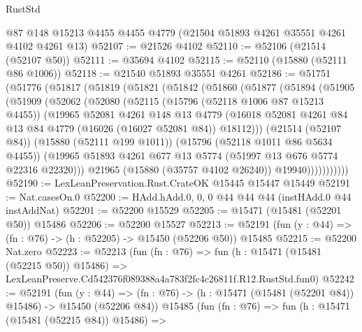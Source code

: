 \begin{lexlean}{RustStd}
\begin{coremodule}
    @87
    @148
    @15213
    @4455
    @4455
    @4779
    (@21504 @51893 @4261 @35551 @4261 @4102 @4261 @13)
@52107 := @21526 @4102
@52110 := @52106 (@21514 (@52107 @50))
@52111 := @35694 @4102
@52115 := @52110 (@15880 (@52111 @86 @1006))
@52118 := @21540 @51893 @35551 @4261
@52186 := @51751
    (@51776
      (@51817
        (@51819
          (@51821
            (@51842
              (@51860
                (@51877
                  (@51894
                    (@51905
                      (@51909
                        (@52062
                          (@52080
                            (@52115
                              (@15796 (@52118 @1006 @87 @15213 @4455))
                              (@19965
                                @52081
                                @4261
                                @148
                                @13
                                @4779
                                (@16018
                                  @52081
                                  @4261
                                  @84
                                  @13
                                  @84
                                  @4779
                                  (@16026 (@16027 @52081 @84))
                                  @18112)))
                            (@21514 (@52107 @84))
                            (@15880 (@52111 @199 @1011))
                            (@15796 (@52118 @1011 @86 @5634 @4455))
                            (@19965
                              @51893
                              @4261
                              @677
                              @13
                              @5774
                              (@51997 @13 @676 @5774 @22316 @22320)))
                          @21965
                          (@15880 (@35757 @4102 @26240))
                          @19940)))))))))))
@52190 := LexLeanPreservation.Rust.CrateOK @15445 @15447 @15449
@52191 := Nat.casesOn.{0}
@52200 := HAdd.hAdd.{0, 0, 0} @44 @44 @44 (instHAdd.{0} @44 instAddNat)
@52201 := @52200 @15529
@52205 := @15471 (@15481 (@52201 @50)) @15486
@52206 := @52200 @15527
@52213 := @52191 (fun (y : @44) => (fn : @76) -> (h : @52205) -> @15450 (@52206 @50)) @15485
@52215 := @52200 Nat.zero
@52223 := @52213
    (fun (fn : @76) =>
    fun (h : @15471 (@15481 (@52215 @50)) @15486) =>
    LexLeanPreserve.Cd542376f089388a4a783f2fc4c26811f.R12.RustStd.fun0)
@52242 := @52191
    (fun (y : @44) =>
    (fn : @76) -> (h : @15471 (@15481 (@52201 @84)) @15486) -> @15450 (@52206 @84))
    @15485
    (fun (fn : @76) =>
    fun (h : @15471 (@15481 (@52215 @84)) @15486) =>

\end{coremodule}
\end{lexlean}
